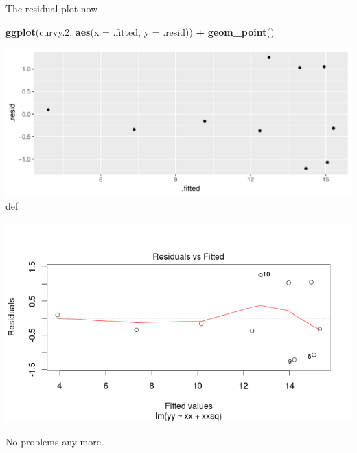 \documentclass[ignorenonframetext,]{beamer}
\newenvironment{Shaded}{\begin{snugshade}}{\end{snugshade}}
\newcommand{\DataTypeTok}[1]{\textcolor[rgb]{0.13,0.29,0.53}{#1}}
\newcommand{\FloatTok}[1]{\textcolor[rgb]{0.00,0.00,0.81}{#1}}
\newcommand{\KeywordTok}[1]{\textcolor[rgb]{0.13,0.29,0.53}{\textbf{#1}}}
\newcommand{\NormalTok}[1]{#1}
\newcommand{\OperatorTok}[1]{\textcolor[rgb]{0.81,0.36,0.00}{\textbf{#1}}}
\newcommand{\StringTok}[1]{\textcolor[rgb]{0.31,0.60,0.02}{#1}}
\begin{document}
\begin{frame}[fragile]{The residual plot now}
\protect\hypertarget{the-residual-plot-now}{}

\begin{Shaded}
\begin{Highlighting}[]
\KeywordTok{ggplot}\NormalTok{(curvy}\FloatTok{.2}\NormalTok{, }\KeywordTok{aes}\NormalTok{(}\DataTypeTok{x =}\NormalTok{ .fitted, }\DataTypeTok{y =}\NormalTok{ .resid)) }\OperatorTok{+}\StringTok{ }\KeywordTok{geom_point}\NormalTok{()}
\end{Highlighting}
\end{Shaded}

\includegraphics{figure/unnamed-chunk-21-1.pdf} def

\includegraphics{curvy-resid2.png}

No problems any more.

\end{frame}
\end{document}
